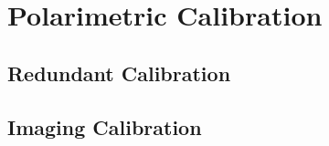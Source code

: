 \chapter{Polarimetric Calibration}
\label{chapter:polcal}



\section{Redundant Calibration}

\section{Imaging Calibration}
